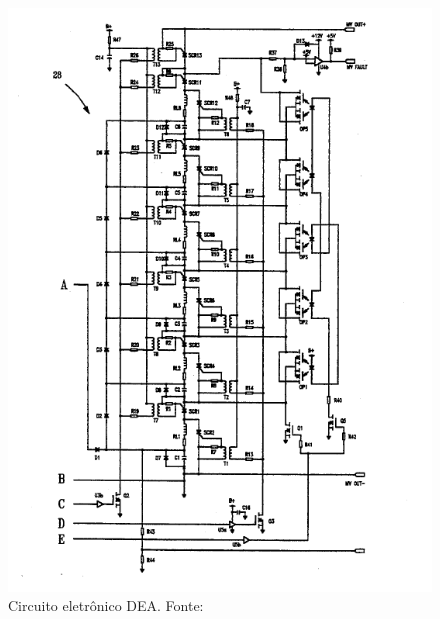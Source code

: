 \begin{figure}[h!]
	\centering
		\includegraphics[keepaspectratio=true,scale=1.2,angle=-90]{figuras/circuitodea.png}
	\caption{Circuito eletrônico DEA. Fonte: \cite{dea}}
	\label{fig:circuitodea}
\end{figure}

\pagebreak
